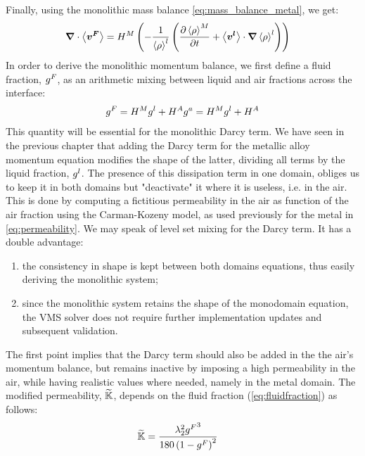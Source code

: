Finally, using the monolithic mass balance \cref{eq:mass_balance_metal}, we get:
\begin{align}
\label{eq:monolithic_mass}
& \boldsymbol{\nabla} \cdot \left \langle \boldsymbol{v^F} \right \rangle = H^M \left( -\frac{1}{\left \langle \rho \right \rangle^l} \left( \frac{\partial \left \langle \rho \right \rangle^M }{\partial t} + \left \langle \boldsymbol{v^l} \right \rangle \cdot  \boldsymbol{\nabla} \left \langle \rho \right \rangle^l \right) \right)
\end{align}
In order to derive the monolithic momentum balance, we first define a fluid fraction, ${g^F}$, as an arithmetic mixing 
between liquid and air fractions across the interface:
\begin{align}
\label{eq:fluidfraction}
{g^F} = H^M {g^l} + H^A {g^a} = H^M {g^l} + H^A
\end{align}
This quantity will be essential for the monolithic Darcy term.
We have seen in the previous chapter that adding the Darcy term for the metallic alloy momentum equation modifies the shape of the 
latter, dividing all terms by the liquid fraction, ${g^l}$. The presence of this dissipation term 
in one domain, obliges us to keep it in both domains but "deactivate" it where it is useless, i.e. in the air.
This is done by computing a fictitious permeability in the air as function of the air fraction using the Carman-Kozeny model,
as used previously for the metal in \cref{eq:permeability}. We may speak of level set mixing for the Darcy term.
It has a double advantage:
\begin{enumerate}
\item the consistency in shape is kept between both domains equations, thus easily deriving the monolithic system;
\item since the monolithic system retains the shape of the monodomain equation, the VMS solver does not require further implementation updates
and subsequent validation.
\end{enumerate}
%
The first point implies that the Darcy term should also be added in the the air's momentum balance, but remains inactive 
by imposing a high permeability in the air, while having realistic values where needed, namely in the metal domain.
The modified permeability, $\widetilde{\mathbb{K}}$, depends on the fluid fraction (\cref{eq:fluidfraction}) as follows:
\begin{align}
\label{eq:darcy_modif}
&\widetilde{\mathbb{K}} = \frac{{\lambda}_{2}^2 {g^F}^3}{180\left( 1-{g^F} \right)^2}	
\end{align}

